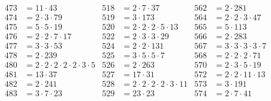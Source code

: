 \begin{align*}
  473&=11\cdot43                             & 518&=2\cdot7\cdot37                                    & 562&=2\cdot281                        \\
  474&=2\cdot3\cdot79                        & 519&=3\cdot173                                         & 564&=2\cdot2\cdot3\cdot47             \\
  475&=5\cdot5\cdot19                        & 520&=2\cdot2\cdot2\cdot5\cdot13                        & 565&=5\cdot113                        \\
  476&=2\cdot2\cdot7\cdot17                  & 522&=2\cdot3\cdot3\cdot29                              & 566&=2\cdot283                        \\
  477&=3\cdot3\cdot53                        & 524&=2\cdot2\cdot131                                   & 567&=3\cdot3\cdot3\cdot3\cdot7        \\
  478&=2\cdot239                             & 525&=3\cdot5\cdot5\cdot7                               & 568&=2\cdot2\cdot2\cdot71             \\
  480&=2\cdot2\cdot2\cdot2\cdot2\cdot3\cdot5 & 526&=2\cdot263                                         & 570&=2\cdot3\cdot5\cdot19             \\
  481&=13\cdot37                             & 527&=17\cdot31                                         & 572&=2\cdot2\cdot11\cdot13            \\
  482&=2\cdot241                             & 528&=2\cdot2\cdot2\cdot2\cdot3\cdot11                  & 573&=3\cdot191                        \\
  483&=3\cdot7\cdot23                        & 529&=23\cdot23                                         & 574&=2\cdot7\cdot41                  
\end{align*}


